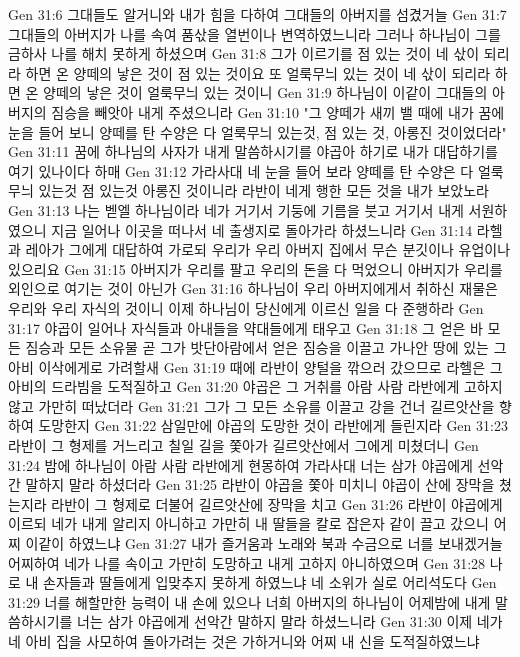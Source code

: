 Gen 31:6  그대들도 알거니와 내가 힘을 다하여 그대들의 아버지를 섬겼거늘
Gen 31:7  그대들의 아버지가 나를 속여 품삯을 열번이나 변역하였느니라 그러나 하나님이 그를 금하사 나를 해치 못하게 하셨으며
Gen 31:8  그가 이르기를 점 있는 것이 네 삯이 되리라 하면 온 양떼의 낳은 것이 점 있는 것이요 또 얼룩무늬 있는 것이 네 삯이 되리라 하면 온 양떼의 낳은 것이 얼룩무늬 있는 것이니
Gen 31:9  하나님이 이같이 그대들의 아버지의 짐승을 빼앗아 내게 주셨으니라
Gen 31:10  "그 양떼가 새끼 밸 때에 내가 꿈에 눈을 들어 보니 양떼를 탄 수양은 다 얼룩무늬 있는것, 점 있는 것, 아롱진 것이었더라"
Gen 31:11  꿈에 하나님의 사자가 내게 말씀하시기를 야곱아 하기로 내가 대답하기를 여기 있나이다 하매
Gen 31:12  가라사대 네 눈을 들어 보라 양떼를 탄 수양은 다 얼룩무늬 있는것 점 있는것 아롱진 것이니라 라반이 네게 행한 모든 것을 내가 보았노라
Gen 31:13  나는 벧엘 하나님이라 네가 거기서 기둥에 기름을 붓고 거기서 내게 서원하였으니 지금 일어나 이곳을 떠나서 네 출생지로 돌아가라 하셨느니라
Gen 31:14  라헬과 레아가 그에게 대답하여 가로되 우리가 우리 아버지 집에서 무슨 분깃이나 유업이나 있으리요
Gen 31:15  아버지가 우리를 팔고 우리의 돈을 다 먹었으니 아버지가 우리를 외인으로 여기는 것이 아닌가
Gen 31:16  하나님이 우리 아버지에게서 취하신 재물은 우리와 우리 자식의 것이니 이제 하나님이 당신에게 이르신 일을 다 준행하라
Gen 31:17  야곱이 일어나 자식들과 아내들을 약대들에게 태우고
Gen 31:18  그 얻은 바 모든 짐승과 모든 소유물 곧 그가 밧단아람에서 얻은 짐승을 이끌고 가나안 땅에 있는 그 아비 이삭에게로 가려할새
Gen 31:19  때에 라반이 양털을 깎으러 갔으므로 라헬은 그 아비의 드라빔을 도적질하고
Gen 31:20  야곱은 그 거취를 아람 사람 라반에게 고하지 않고 가만히 떠났더라
Gen 31:21  그가 그 모든 소유를 이끌고 강을 건너 길르앗산을 향하여 도망한지
Gen 31:22  삼일만에 야곱의 도망한 것이 라반에게 들린지라
Gen 31:23  라반이 그 형제를 거느리고 칠일 길을 쫓아가 길르앗산에서 그에게 미쳤더니
Gen 31:24  밤에 하나님이 아람 사람 라반에게 현몽하여 가라사대 너는 삼가 야곱에게 선악간 말하지 말라 하셨더라
Gen 31:25  라반이 야곱을 쫓아 미치니 야곱이 산에 장막을 쳤는지라 라반이 그 형제로 더불어 길르앗산에 장막을 치고
Gen 31:26  라반이 야곱에게 이르되 네가 내게 알리지 아니하고 가만히 내 딸들을 칼로 잡은자 같이 끌고 갔으니 어찌 이같이 하였느냐
Gen 31:27  내가 즐거움과 노래와 북과 수금으로 너를 보내겠거늘 어찌하여 네가 나를 속이고 가만히 도망하고 내게 고하지 아니하였으며
Gen 31:28  나로 내 손자들과 딸들에게 입맞추지 못하게 하였느냐 네 소위가 실로 어리석도다
Gen 31:29  너를 해할만한 능력이 내 손에 있으나 너희 아버지의 하나님이 어제밤에 내게 말씀하시기를 너는 삼가 야곱에게 선악간 말하지 말라 하셨느니라
Gen 31:30  이제 네가 네 아비 집을 사모하여 돌아가려는 것은 가하거니와 어찌 내 신을 도적질하였느냐
